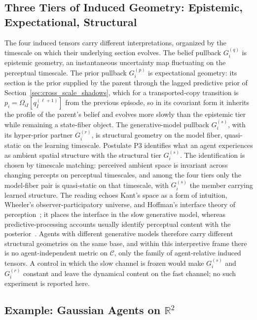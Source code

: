 \documentclass[11pt]{article}
\begin{document}
\subsection{Three Tiers of Induced Geometry: Epistemic, Expectational, Structural}
\label{sec:three_tiers}

The four induced tensors carry different interpretations, organized by the timescale on which their underlying section evolves. The belief pullback $G_i^{(q)}$ is epistemic geometry, an instantaneous uncertainty map fluctuating on the perceptual timescale. The prior pullback $G_i^{(p)}$ is expectational geometry: its section is the prior supplied by the parent through the lagged predictive prior of Section~\ref{sec:cross_scale_shadows}, which for a transported-copy transition is $p_i = \Omega_{iI}[q_I^{(\ell+1)}]$ from the previous episode, so in its covariant form it inherits the profile of the parent's belief and evolves more slowly than the epistemic tier while remaining a state-fiber object. The generative-model pullback $G_i^{(s)}$, with its hyper-prior partner $G_i^{(r)}$, is structural geometry on the model fiber, quasi-static on the learning timescale. Postulate P3 identifies what an agent experiences as ambient spatial structure with the structural tier $G_i^{(s)}$. The identification is chosen by timescale matching: perceived ambient space is invariant across changing percepts on perceptual timescales, and among the four tiers only the model-fiber pair is quasi-static on that timescale, with $G_i^{(s)}$ the member carrying learned structure. The reading echoes Kant's space as a form of intuition, Wheeler's observer-participatory universe, and Hoffman's interface theory of perception~\cite{Hoffman2019}; it places the interface in the slow generative model, whereas predictive-processing accounts usually identify perceptual content with the posterior~\cite{Clark2016, Seth2021}. Agents with different generative models therefore carry different structural geometries on the same base, and within this interpretive frame there is no agent-independent metric on $\mathcal{C}$, only the family of agent-relative induced tensors. A control in which the slow channel is frozen would make $G_i^{(s)}$ and $G_i^{(r)}$ constant and leave the dynamical content on the fast channel; no such experiment is reported here.

\subsection{Example: Gaussian Agents on \texorpdfstring{$\mathbb{R}^2$}{R2}}
\end{document}
